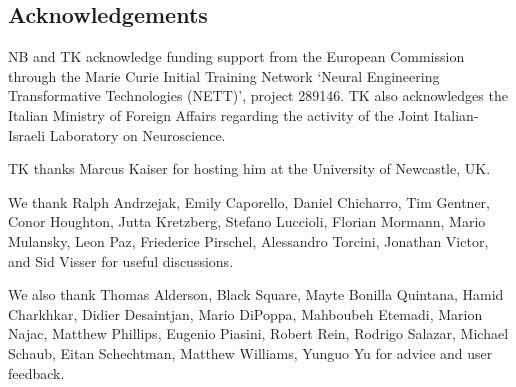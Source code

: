 \documentclass[10pt,twocolumn]{elsart5p}
\begin{document}
\begin{thanks}
\section{\label{s:Acknowledgement} \textbf{Acknowledgements}}

NB and TK acknowledge funding support from the European Commission through the Marie Curie Initial Training 	Network `Neural Engineering Transformative Technologies (NETT)', project 289146. TK also acknowledges the Italian Ministry of Foreign Affairs regarding the activity of the Joint Italian-Israeli Laboratory on Neuroscience.

TK thanks Marcus Kaiser for hosting him at the University of Newcastle, UK.
     
We thank Ralph Andrzejak, Emily Caporello, Daniel Chicharro, Tim Gentner, Conor Houghton, Jutta Kretzberg, Stefano Luccioli, Florian Mormann, Mario Mulansky, Leon Paz, Friederice Pirschel, Alessandro Torcini, Jonathan Victor, and Sid Visser for useful discussions.

We also thank Thomas Alderson, Black Square, Mayte Bonilla Quintana, Hamid Charkhkar, Didier Desaintjan, Mario DiPoppa, Mahboubeh Etemadi, Marion Najac, Matthew Phillips, Eugenio Piasini, Robert Rein, Rodrigo Salazar, Michael Schaub, Eitan Schechtman, Matthew Williams, Yunguo Yu for advice and user feedback.
\end{thanks}
\end{document}
